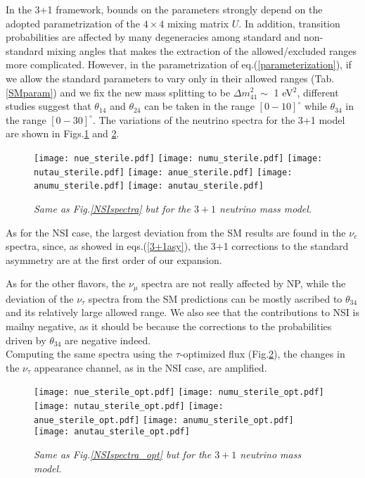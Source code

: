 \documentclass[12pt]{article}
\begin{document}
In the 3+1 framework, bounds on the parameters strongly depend on the adopted parametrization of the $4\times 4$ mixing matrix $U$. In addition, transition probabilities are affected by many degeneracies among standard and non-standard mixing angles that makes the extraction of the allowed/excluded ranges more complicated. However, in the parametrization of eq.(\ref{parameterization}), if we allow the standard parameters to vary only in their allowed ranges (Tab.\ref{SMparam}) and we fix the new mass splitting to be $\Delta m^2_{41} \sim$ 1 eV$^2$, different studies \cite{Boser:2019rta,Dentler:2018sju} suggest that $\theta_{14}$ and $\theta_{24}$ can be taken in the range $[0-10]^\circ$ while $\theta_{34}$ in the range $[0-30]^\circ$. The variations of the neutrino spectra for the 3+1 model are shown in Figs.\ref{sterilespectra} and \ref{sterilespectra_opt}.
\begin{figure}
    \centering
    \texttt{[image: nue\_sterile.pdf]}
    \texttt{[image: numu\_sterile.pdf]}
    \texttt{[image: nutau\_sterile.pdf]}
    \texttt{[image: anue\_sterile.pdf]}
    \texttt{[image: anumu\_sterile.pdf]}
    \texttt{[image: anutau\_sterile.pdf]}
    \caption{\it Same as Fig.\ref{NSIspectra} but  for the $3+1$ neutrino mass model.}
    \label{sterilespectra}
\end{figure}
As for the NSI case,  the largest deviation from the SM results  are found in the $\nu_e$ spectra, since, as showed in eqs.(\ref{3+1asy}), the 3+1 corrections to the standard asymmetry are at the first order of our expansion.


As for the other flavors, the $\nu_\mu$ spectra are not really affected by NP, while the deviation of the $\nu_\tau$ spectra from the SM predictions can be mostly ascribed to $\theta_{34}$ and its relatively large allowed range. We also see that the contributions to NSI is mailny negative, as it should be because 
 the corrections to the probabilities driven by $\theta_{34}$ are negative indeed. \\
Computing the same spectra using the $\tau$-optimized flux (Fig.\ref{sterilespectra_opt}), the changes in the $\nu_\tau$ appearance channel, as in the NSI case, are amplified.


\begin{figure}
    \centering
    \texttt{[image: nue\_sterile\_opt.pdf]}
    \texttt{[image: numu\_sterile\_opt.pdf]}
    \texttt{[image: nutau\_sterile\_opt.pdf]}
    \texttt{[image: anue\_sterile\_opt.pdf]}
    \texttt{[image: anumu\_sterile\_opt.pdf]}
    \texttt{[image: anutau\_sterile\_opt.pdf]}
    \caption{\it Same as Fig.\ref{NSIspectra_opt}  but  for the $3+1$ neutrino mass model.}
    \label{sterilespectra_opt}
\end{figure}
 
\end{document}
